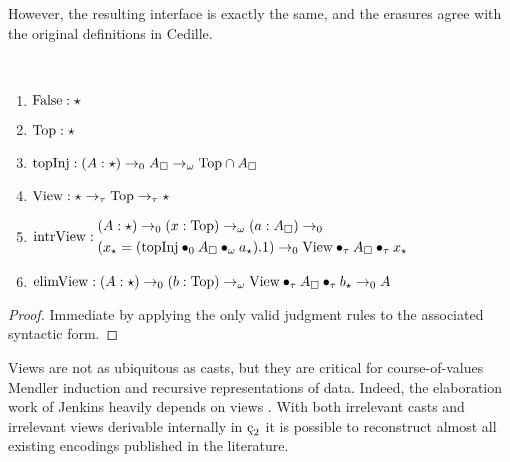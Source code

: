 However, the resulting interface is exactly the same, and the erasures agree with the original definitions in Cedille.
\begin{theorem}
    \label{lem:2:view_derivations}
    \textcolor{white}{\_}
    \begin{enumerate}
        \item $\textnormal{False} : \star$
        \item $\textnormal{Top} : \star$
        \item $\textnormal{topInj} : (A:\star) \to_0 A_\square \to_\omega \textnormal{Top} \cap A_\square$
        \item $\textnormal{View} : \star \to_\tau \textnormal{Top} \to_\tau \star$
        \item {
            $
                \textnormal{intrView} : 
                \begin{aligned}
                    &(A:\star) \to_0 (x:\textnormal{Top}) \to_\omega (a:A_\square) \to_0
                        \\ &(x_\star = (\textnormal{topInj} \bullet_{0} A_\square \bullet_{\omega} a_\star).1) \to_0 \textnormal{View} \bullet_{\tau} A_\square \bullet_{\tau} x_\star
                \end{aligned}
            $
        }
        \item $\textnormal{elimView} : (A:\star) \to_0 (b:\textnormal{Top}) \to_\omega \textnormal{View} \bullet_{\tau} A_\square \bullet_{\tau} b_\star \to_0 A$
    \end{enumerate}
\end{theorem}
\begin{proof}
    Immediate by applying the only valid judgment rules to the associated syntactic form.
\end{proof}
Views are not as ubiquitous as casts, but they are critical for course-of-values Mendler induction and recursive representations of data.
Indeed, the elaboration work of Jenkins heavily depends on views \cite{jenkins2023elaborating}.
With both irrelevant casts and irrelevant views derivable internally in $\ced$ it is possible to reconstruct almost all existing encodings published in the literature.

